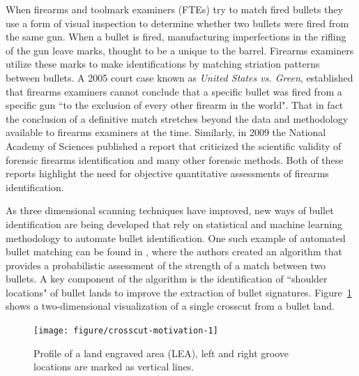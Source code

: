 \documentclass[12pt]{article}\usepackage[]{graphicx}\usepackage[]{color}
\newenvironment{knitrout}{}{} %
\theoremstyle{nonumberplain}
\newcommand{\hh}[1]{{\color{orange}{#1}}}
\begin{document}
When firearms and toolmark examiners (FTEs) try to match fired bullets they use a form of visual inspection to determine whether two bullets were fired from the same gun. When a bullet is  fired, manufacturing imperfections in the rifling of the gun  leave marks, thought to be a unique to the barrel. Firearms examiners utilize these marks to make identifications by matching striation patterns between bullets. A 2005 court case known as \textit{United States vs. Green}, established that firearms examiners cannot conclude that a specific bullet was fired from a specific gun ``to the exclusion of every other firearm in the world". That in fact the conclusion of a definitive match stretches beyond the data and methodology available to firearms examiners at the time.  Similarly, in 2009 the National Academy of Sciences published a report that criticized the scientific validity of forensic firearms identification and many other forensic methods. Both of these reports highlight the need for objective quantitative assessments of firearms identification. 

As three dimensional scanning techniques have improved, new ways of bullet identification are being developed that rely on  statistical and machine learning methodology to automate bullet identification. One such example of automated bullet matching can be found in \cite{hare2017}, where the authors created an algorithm  that provides a probabilistic assessment of the strength of a match between two bullets. A key component of the algorithm  is the identification of ``shoulder locations" of bullet lands to improve the extraction of bullet signatures. \hh{XXX start by showing a rendering of an x3p scan.}
Figure~\ref{fig:crosscut-motivation} shows a two-dimensional visualization of a single crosscut from a bullet land.  




\begin{knitrout}
\color{fgcolor}\begin{figure}

{\centering \texttt{[image: figure/crosscut-motivation-1]} 

}

\caption[Profile of a land engraved area (LEA), left and right groove locations are marked as vertical lines]{Profile of a land engraved area (LEA), left and right groove locations are marked as vertical lines.}\label{fig:crosscut-motivation}
\end{figure}


\end{knitrout}
\end{document}
